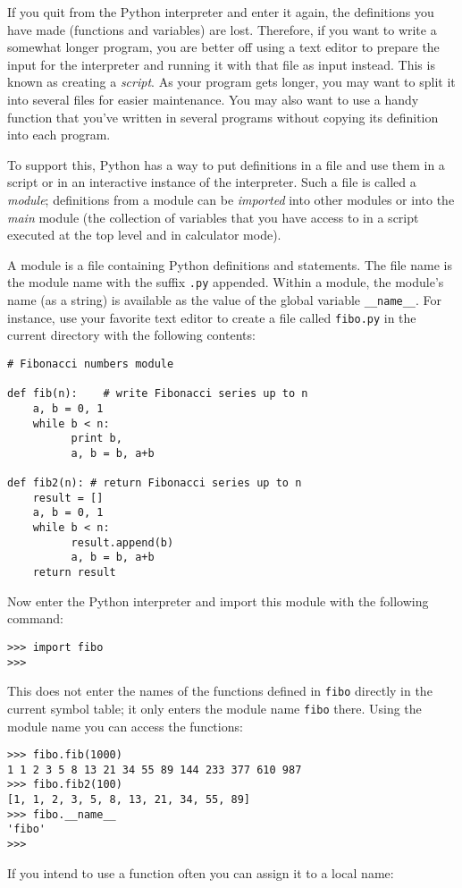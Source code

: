If you quit from the Python interpreter and enter it again, the
definitions you have made (functions and variables) are lost.
Therefore, if you want to write a somewhat longer program, you are
better off using a text editor to prepare the input for the interpreter
and running it with that file as input instead.  This is known as creating a
{\em script}.  As your program gets longer, you may want to split it
into several files for easier maintenance.  You may also want to use a
handy function that you've written in several programs without copying
its definition into each program.

To support this, Python has a way to put definitions in a file and use
them in a script or in an interactive instance of the interpreter.
Such a file is called a {\em module}; definitions from a module can be
{\em imported} into other modules or into the {\em main} module (the
collection of variables that you have access to in a script
executed at the top level
and in calculator mode).

A module is a file containing Python definitions and statements.  The
file name is the module name with the suffix {\tt .py} appended.  Within
a module, the module's name (as a string) is available as the value of
the global variable {\tt __name__}.  For instance, use your favorite text
editor to create a file called {\tt fibo.py} in the current directory
with the following contents:

\bcode\begin{verbatim}
# Fibonacci numbers module

def fib(n):    # write Fibonacci series up to n
    a, b = 0, 1
    while b < n:
          print b,
          a, b = b, a+b

def fib2(n): # return Fibonacci series up to n
    result = []
    a, b = 0, 1
    while b < n:
          result.append(b)
          a, b = b, a+b
    return result
\end{verbatim}\ecode
%
Now enter the Python interpreter and import this module with the
following command:

\bcode\begin{verbatim}
>>> import fibo
>>> 
\end{verbatim}\ecode
%
This does not enter the names of the functions defined in
{\tt fibo}
directly in the current symbol table; it only enters the module name
{\tt fibo}
there.
Using the module name you can access the functions:

\bcode\begin{verbatim}
>>> fibo.fib(1000)
1 1 2 3 5 8 13 21 34 55 89 144 233 377 610 987
>>> fibo.fib2(100)
[1, 1, 2, 3, 5, 8, 13, 21, 34, 55, 89]
>>> fibo.__name__
'fibo'
>>> 
\end{verbatim}\ecode
%
If you intend to use a function often you can assign it to a local name:

